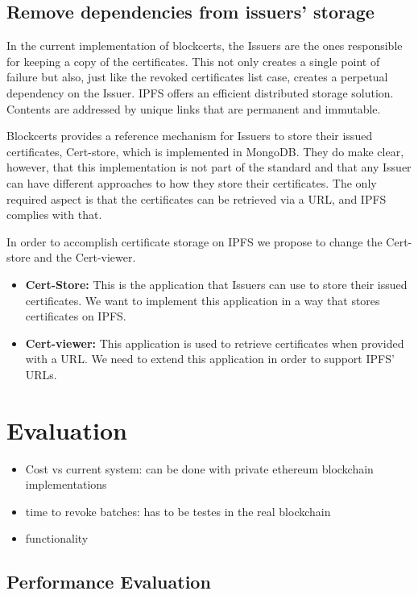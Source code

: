 \documentclass[llncsdoc]{llncs}
\begin{document}
\subsection{Remove dependencies from issuers' storage}
In the current implementation of blockcerts, the Issuers are the ones responsible for keeping a copy of the certificates. This not only creates a single point of failure but also, just like the revoked certificates list case, creates a perpetual dependency on the Issuer. IPFS offers an efficient distributed storage solution. Contents are addressed by unique links that are permanent and immutable.

Blockcerts provides a reference mechanism for Issuers to store their issued certificates, Cert-store, which is implemented in MongoDB. They do make clear, however, that this implementation is not part of the standard and that any Issuer can have different approaches to how they store their certificates. The only required aspect is that the certificates can be retrieved via a URL, and IPFS complies with that.

In order to accomplish certificate storage on IPFS we propose to change the Cert-store and the Cert-viewer.
\begin{itemize}
    \item \textbf{Cert-Store:} This is the application that Issuers can use to store their issued certificates. We want to implement this application in a way that stores certificates on IPFS.
    \item \textbf{Cert-viewer:} This application is used to retrieve certificates when provided with a URL. We need to extend this application in order to support IPFS' URLs.
\end{itemize}


\section{Evaluation}
\label{sec:evaluation}
\begin{itemize}
    \item Cost vs current system: can be done with private ethereum blockchain implementations
    \item time to revoke batches: has to be testes in the real blockchain
    \item functionality
\end{itemize}

\subsection{Performance Evaluation}
\end{document}
